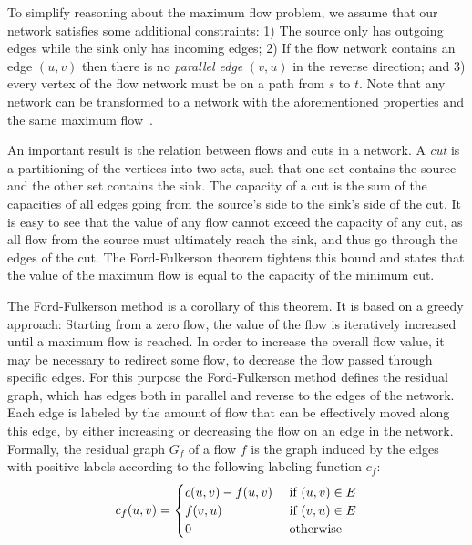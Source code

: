 \documentclass{llncs}
\begin{document}
To simplify reasoning about the maximum flow problem, we assume that our network satisfies some additional constraints: 1) The source only has outgoing edges while the sink only has incoming edges; 2) If the flow network contains an edge $(u, v)$ then there is no \emph{parallel edge} $(v, u)$ in the reverse direction; and 3) every vertex of the flow network must be on a path from $s$ to $t$. Note that any network can be transformed to a network with the aforementioned properties and the same maximum flow~\cite{CLRS09}.


An important result is the relation between flows and cuts in a network. A \emph{cut} is a partitioning of the vertices into two sets, such that one set contains 
the source and the other set contains the sink. The capacity of a cut is the sum of the capacities of all edges going from the source's side to the sink's side of the cut.
It is easy to see that the value of any flow cannot exceed the capacity of any cut, as all flow from the source must ultimately reach the sink, and thus go through the edges of the cut. The Ford-Fulkerson theorem tightens this bound and states that the value of the maximum flow is equal to the capacity of the minimum cut.

The Ford-Fulkerson method is a corollary of this theorem. It is based on a greedy approach: Starting from a zero flow, the value of the flow is iteratively increased until a maximum flow is reached. In order to increase the overall flow value, it may be necessary to redirect some flow, \ie to decrease the flow passed through specific edges. For this purpose the Ford-Fulkerson method defines the residual graph, which has edges both in parallel and reverse to the edges of the network. 
Each edge is labeled by the amount of flow that can be effectively moved along this edge, by either increasing or decreasing the flow on an edge in the network.
Formally, the residual graph $G_f$ of a flow $f$ is the graph induced by the 
edges with positive labels according to the following labeling function $c_f$:
\[ c_f (u, v) = 
  \begin{cases}
  c (u, v) - f(u, v) \hfill & \text{ if $(u, v) \in E$} \\
  f (v, u) \hfill & \text{ if $(v, u) \in E$} \\  
  0 \hfill & \text{ otherwise} \\
  \end{cases} 
\]
\end{document}
